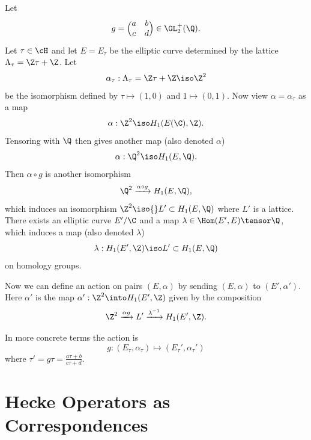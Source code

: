 \documentclass{report}
\begin{document}
Let
$$g=\Bigl(\begin{matrix}a&b\\c&d\end{matrix}\Bigr)\in\GL_2^{+}(\Q).$$
Let $\tau\in\cH$ and let $E=E_{\tau}$ be the elliptic curve determined
by the lattice $\Lambda_{\tau}=\Z\tau+\Z$. Let
$$
  \alpha_{\tau}:\Lambda_{\tau}=\Z\tau+\Z \iso\Z^2
$$
be the isomorphism defined by $\tau \mapsto(1,0)$ and
$1\mapsto (0,1)$.
Now view $\alpha=\alpha_{\tau}$ as a map
$$\alpha:\Z^2\iso H_1(E(\C),\Z).$$
Tensoring with $\Q$ then gives another map (also denoted $\alpha$)
$$\alpha:\Q^2\iso H_1(E,\Q).$$
Then $\alpha\circ g$ is another isomorphism
$$
 \Q^2\xrightarrow{\alpha\circ g} H_1(E,\Q),
$$
which induces an isomorphism $\Z^2\iso{}L'\subset H_1(E,\Q)$
where $L'$ is a lattice.
There exists an elliptic curve $E'/\C$ and a map
$\lambda\in\Hom(E',E)\tensor\Q$,
which induces a map (also denoted $\lambda$)
$$\lambda:H_1(E',\Z)\iso L'\subset H_1(E,\Q)$$
on homology groups.

Now we can define an action on pairs $(E,\alpha)$ by sending
$(E,\alpha)$ to $(E',\alpha')$. Here $\alpha'$ is the map
$\alpha':\Z^2\into H_1(E',\Z)$ given by the composition
$$\Z^2\xrightarrow{\alpha{}g}L'\xrightarrow{\lambda^{-1}}H_1(E',\Z).$$

In more concrete terms the action is
$$g:(E_{\tau},\alpha_{\tau})\mapsto (E_{\tau}',\alpha_{\tau}')$$
where $\tau'=g\tau=\frac{a\tau+b}{c\tau+d}.$

\chapter{Hecke Operators as Correspondences}
\end{document}
